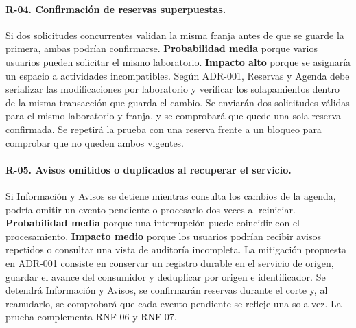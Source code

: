 {  \paragraph{R-04. Confirmación de reservas superpuestas.}
  Si dos solicitudes concurrentes validan la misma franja antes de que
  se guarde la primera, ambas podrían confirmarse. \textbf{Probabilidad
  media} porque varios usuarios pueden solicitar el mismo laboratorio.
  \textbf{Impacto alto} porque se asignaría un espacio a actividades
  incompatibles. Según ADR-001, Reservas y Agenda debe serializar las
  modificaciones por laboratorio y verificar los solapamientos dentro de
  la misma transacción que guarda el cambio. Se enviarán dos solicitudes
  válidas para el mismo laboratorio y franja, y se comprobará que quede
  una sola reserva confirmada. Se repetirá la prueba con una reserva frente
  a un bloqueo para comprobar que no queden ambos vigentes.

  \paragraph{R-05. Avisos omitidos o duplicados al recuperar el servicio.}
  Si Información y Avisos se detiene mientras consulta los cambios de la
  agenda, podría omitir un evento pendiente o procesarlo dos veces al
  reiniciar. \textbf{Probabilidad media} porque una interrupción puede
  coincidir con el procesamiento. \textbf{Impacto medio} porque los
  usuarios podrían recibir avisos repetidos o consultar una vista de
  auditoría incompleta. La mitigación propuesta en ADR-001 consiste en
  conservar un registro durable en el servicio de origen, guardar el
  avance del consumidor y deduplicar por origen e identificador. Se
  detendrá Información y Avisos, se confirmarán reservas durante el corte
  y, al reanudarlo, se comprobará que cada evento pendiente se refleje
  una sola vez. La prueba complementa RNF-06 y RNF-07.
}

\newcommand{\CarlosDeclaracionIA}{%
  \paragraph{Carlos Manotoa, Responsable de Calidad.}
  Utilicé OpenAI Codex (familia de modelos GPT-6) como apoyo para buscar,
  filtrar y cotejar fuentes, preparar el texto de mi aporte, convertirlo a
  LaTeX y Markdown y resolver problemas de compilación y de Git. Las capturas
  muestran los resultados de una ejecución real del esqueleto en mi equipo,
  realizada con apoyo de Codex. Revisé manualmente las referencias y la
  documentación, y comprobé que las citas y mis apartados aparecieran
  correctamente en el PDF compilado.
}
